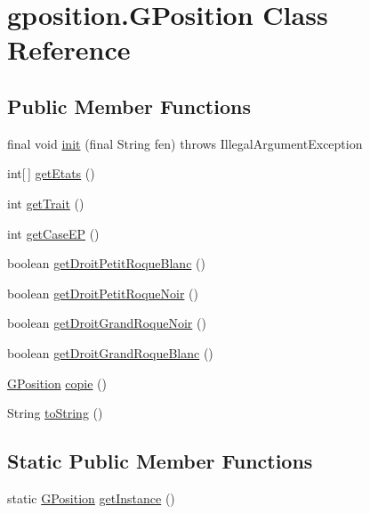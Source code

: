 \hypertarget{classgposition_1_1_g_position}{\section{gposition.\-G\-Position Class Reference}
\label{classgposition_1_1_g_position}
}
\subsection*{Public Member Functions}
\begin{DoxyCompactItemize}
\item 
final void \hyperlink{classgposition_1_1_g_position_ab71eb752cbc4e674306f6dc5c0ade871}{init} (final String fen)  throws Illegal\-Argument\-Exception 
\item 
int\mbox{[}$\,$\mbox{]} \hyperlink{classgposition_1_1_g_position_ad2e03c7901f96c5d7cfd959e78151513}{get\-Etats} ()
\item 
int \hyperlink{classgposition_1_1_g_position_afb186e1432a2a5a933c17308e369a2e5}{get\-Trait} ()
\item 
int \hyperlink{classgposition_1_1_g_position_aa62f7f8397fcaa701f3b22270175453c}{get\-Case\-E\-P} ()
\item 
boolean \hyperlink{classgposition_1_1_g_position_adb7d29ef113b281cf83851b78f6e891d}{get\-Droit\-Petit\-Roque\-Blanc} ()
\item 
boolean \hyperlink{classgposition_1_1_g_position_a6d0bfc45c58db8bb84b5f44dab4955d6}{get\-Droit\-Petit\-Roque\-Noir} ()
\item 
boolean \hyperlink{classgposition_1_1_g_position_a50e74f155dd3b89ef18caf01fc47ae18}{get\-Droit\-Grand\-Roque\-Noir} ()
\item 
boolean \hyperlink{classgposition_1_1_g_position_a30b145f278e8d07bc04767cb71cefd9e}{get\-Droit\-Grand\-Roque\-Blanc} ()
\item 
\hyperlink{classgposition_1_1_g_position}{G\-Position} \hyperlink{classgposition_1_1_g_position_abac88cfbca0333e1b1a9facda5256351}{copie} ()
\item 
String \hyperlink{classgposition_1_1_g_position_adab8495aa332208828929679025bde29}{to\-String} ()
\end{DoxyCompactItemize}
\subsection*{Static Public Member Functions}
\begin{DoxyCompactItemize}
\item 
static \hyperlink{classgposition_1_1_g_position}{G\-Position} \hyperlink{classgposition_1_1_g_position_ac3b5fcacfa8bb4e63911e7f33955000f}{get\-Instance} ()
\end{DoxyCompactItemize}


